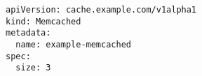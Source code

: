 \begin{verbatim}
apiVersion: cache.example.com/v1alpha1
kind: Memcached
metadata:
  name: example-memcached
spec:
  size: 3
\end{verbatim}